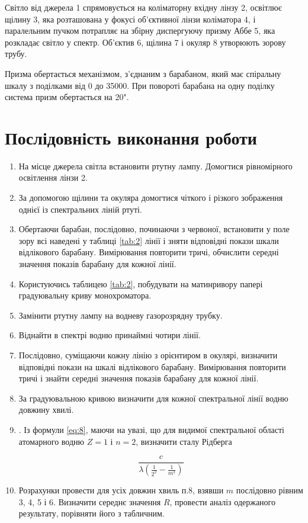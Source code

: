 \documentclass[twocolumn]{el-author}
\begin{document}
Світло від джерела 1 спрямовується на коліматорну вхідну лінзу 2,
освітлює щілину 3, яка розташована у фокусі об'єктивної лінзи коліматора 4,
і паралельним пучком потрапляє на збірну диспергуючу призму Аббе 5, яка
розкладає світло у спектр. Об'єктив 6, щілина 7 і окуляр 8 утворюють зорову
трубу.

Призма обертається механізмом, з'єднаним з барабаном, який має
спіральну шкалу з поділками від 0 до 3500$0$. При повороті барабана на одну
поділку система призм обертається на 20".


\section{Послідовність виконання роботи}

\begin{enumerate}
	\item На місце джерела світла встановити ртутну лампу. Домогтися
рівномірного освітлення лінзи 2.
	\item За допомогою щілини та окуляра домогтися чіткого і різкого
зображення однієї із спектральних ліній ртуті.
	\item Обертаючи барабан, послідовно, починаючи з червоної, встановити у
поле зору всі наведені у таблиці \ref{tab:2} лінії і зняти відповідні покази
шкали відлікового барабану. Вимірювання повторити тричі, обчислити
середні значення показів барабану для кожної лінії.
	\item Користуючись таблицею \ref{tab:2}, побудувати на матинривору папері
градуювальну криву монохроматора.
	\item Замінити ртутну лампу на водневу газорозрядну трубку.
	\item Віднайти в спектрі водню принаймні чотири лінії.
	\item Послідовно, суміщаючи кожну лінію з орієнтиром в окулярі, визначити
відповідні покази на шкалі відлікового барабану. Вимірювання
повторити тричі і знайти середні значення показів барабану для кожної
лінії.
	\item За градуювальною кривою визначити для кожної спектральної лінії
водню довжину хвилі.
	\item . Із формули \ref{eq:8}, маючи на увазі, що для видимої 
	спектральної області атомарного водню $Z=1$ і $n=2$, визначити сталу Рідберга
	
	\begin{equation} 
		\frac{c}{\lambda \left( \frac{1}{2^{2}} - \frac{1}{m^{2}} \right)}
	\end{equation}
	
	\item Розрахунки провести для усіх довжин хвиль п.8, взявши $m$ послідовно
рівним 3, 4, 5 і 6. Визначити середнє значення $R$, провести аналіз
одержаного результату, порівняти його з табличним.
\end{enumerate}
\end{document}
